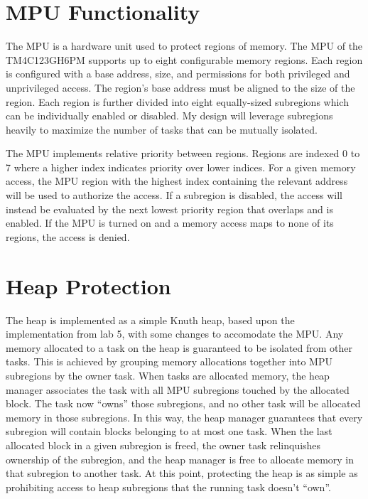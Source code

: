\section{MPU Functionality}

The MPU is a hardware unit used to protect regions of memory. The MPU of the TM4C123GH6PM supports up to eight configurable memory regions. Each region is configured with a base address, size, and permissions for both privileged and unprivileged access. The region's base address must be aligned to the size of the region. Each region is further divided into eight equally-sized subregions which can be individually enabled or disabled. My design will leverage subregions heavily to maximize the number of tasks that can be mutually isolated.

The MPU implements relative priority between regions. Regions are indexed 0 to 7 where a higher index indicates priority over lower indices. For a given memory access, the MPU region with the highest index containing the relevant address will be used to authorize the access. If a subregion is disabled, the access will instead be evaluated by the next lowest priority region that overlaps and is enabled. If the MPU is turned on and a memory access maps to none of its regions, the access is denied.

\section{Heap Protection}

The heap is implemented as a simple Knuth heap, based upon the implementation from lab 5, with some changes to accomodate the MPU. Any memory allocated to a task on the heap is guaranteed to be isolated from other tasks. This is achieved by grouping memory allocations together into MPU subregions by the owner task. When tasks are allocated memory, the heap manager associates the task with all MPU subregions touched by the allocated block. The task now ``owns'' those subregions, and no other task will be allocated memory in those subregions. In this way, the heap manager guarantees that every subregion will contain blocks belonging to at most one task. When the last allocated block in a given subregion is freed, the owner task relinquishes ownership of the subregion, and the heap manager is free to allocate memory in that subregion to another task. At this point, protecting the heap is as simple as prohibiting access to heap subregions that the running task doesn't ``own''.

